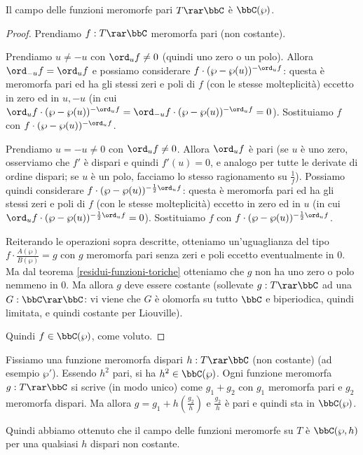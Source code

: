 \begin{teorema}
Il campo delle funzioni meromorfe pari $T\rar\bbC$ è $\bbC(\wp)$.
\end{teorema}
\begin{proof}
Prendiamo $f:T\rar\bbC$ meromorfa pari (non costante).

Prendiamo $u\not=-u$ con $\ord_uf\not=0$ (quindi uno zero o un polo). Allora $\ord_{-u}f=\ord_uf$ e possiamo considerare $f\cdot(\wp-\wp(u))^{-\ord_uf}$:
questa è meromorfa pari ed ha gli stessi zeri e poli di $f$ (con le stesse molteplicità) eccetto
in zero ed in $u,-u$ (in cui $\ord_uf\cdot(\wp-\wp(u))^{-\ord_uf}=\ord_{-u}f\cdot(\wp-\wp(u))^{-\ord_uf}=0$).
Sostituiamo $f$ con $f\cdot(\wp-\wp(u))^{-\ord_uf}$.

Prendiamo $u=-u\not=0$ con $\ord_uf\not=0$. Allora $\ord_uf$ è pari (se $u$ è uno zero, osserviamo che $f'$ è dispari e quindi $f'(u)=0$, e analogo per tutte le derivate di ordine dispari;
se $u$ è un polo, facciamo lo stesso ragionamento su $\frac{1}{f}$). Possiamo quindi considerare $f\cdot(\wp-\wp(u))^{-\frac{1}{2}\ord_uf}$:
questa è meromorfa pari ed ha gli stessi zeri e poli di $f$ (con le stesse molteplicità) eccetto in zero ed in $u$ (in cui $\ord_uf\cdot(\wp-\wp(u))^{-\frac{1}{2}\ord_uf}=0$).
Sostituiamo $f$ con $f\cdot(\wp-\wp(u))^{-\frac{1}{2}\ord_uf}$.

Reiterando le operazioni sopra descritte, otteniamo un'uguaglianza del tipo $f\cdot\frac{A(\wp)}{B(\wp)}=g$ con $g$ meromorfa pari senza zeri e poli eccetto eventualmente in $0$.
Ma dal teorema \ref{residui-funzioni-toriche} otteniamo che $g$ non ha uno zero o polo nemmeno in $0$. Ma allora $g$ deve essere costante
(sollevate $g:T\rar\bbC$ ad una $G:\bbC\rar\bbC$: vi viene che $G$ è olomorfa su tutto $\bbC$ e biperiodica, quindi limitata, e quindi costante per Liouville).

Quindi $f\in\bbC(\wp)$, come voluto.
\end{proof}


Fissiamo una funzione meromorfa dispari $h:T\rar\bbC$ (non costante) (ad esempio $\wp'$).
Essendo $h^2$ pari, si ha $h^2\in\bbC(\wp)$.
Ogni funzione meromorfa $g:T\rar\bbC$ si scrive (in modo unico) come $g_1+g_2$ con $g_1$ meromorfa pari e $g_2$ meromorfa dispari.
Ma allora $g=g_1+h(\frac{g_2}{h})$ e $\frac{g_2}{h}$ è pari e quindi sta in $\bbC(\wp)$.

Quindi abbiamo ottenuto che il campo delle funzioni meromorfe su $T$ è $\bbC(\wp,h)$ per una qualsiasi $h$ dispari non costante.


